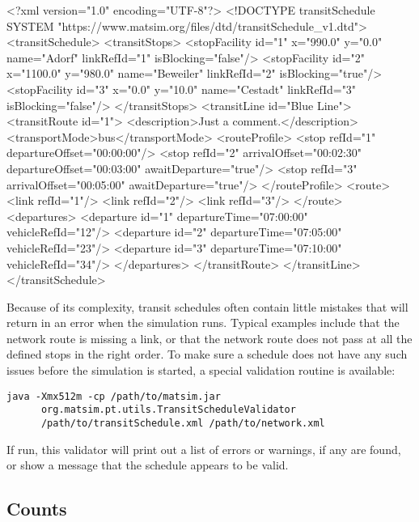 \begin{xml-file}[caption=An example of a schedule.xml,
label=lst:BuildingScenarios:schedule.xml]
<?xml version="1.0" encoding="UTF-8"?>
<!DOCTYPE transitSchedule SYSTEM "https://www.matsim.org/files/dtd/transitSchedule_v1.dtd">
<transitSchedule>
	<transitStops>
		<stopFacility id="1" x="990.0"  y="0.0"   name="Adorf"    
		                                          linkRefId="1" isBlocking="false"/>
		<stopFacility id="2" x="1100.0" y="980.0" name="Beweiler" 
		                                          linkRefId="2" isBlocking="true"/>
		<stopFacility id="3" x="0.0"    y="10.0"  name="Cestadt"  
		                                          linkRefId="3" isBlocking="false"/>
	</transitStops>
	<transitLine id="Blue Line">
		<transitRoute id="1">
			<description>Just a comment.</description>
			<transportMode>bus</transportMode>
			<routeProfile>
				<stop refId="1" departureOffset="00:00:00"/>
				<stop refId="2" arrivalOffset="00:02:30" departureOffset="00:03:00" 
				                                         awaitDeparture="true"/>
				<stop refId="3" arrivalOffset="00:05:00" awaitDeparture="true"/>
			</routeProfile>
			<route>
				<link refId="1"/>
				<link refId="2"/>
				<link refId="3"/>
			</route>
			<departures>
				<departure id="1" departureTime="07:00:00" vehicleRefId="12"/>
				<departure id="2" departureTime="07:05:00" vehicleRefId="23"/>
				<departure id="3" departureTime="07:10:00" vehicleRefId="34"/>
			</departures>
		</transitRoute>
	</transitLine>
</transitSchedule>
\end{xml-file}

Because of its complexity, transit schedules often contain little mistakes that
will return in an error when the simulation runs. Typical examples include that
the network route is missing a link, or that the network route does not pass at
all the defined stops in the right order. To make sure a schedule does not have
any such issues before the simulation is started, a special validation routine
is available:

\begin{verbatim}
java -Xmx512m -cp /path/to/matsim.jar 
      org.matsim.pt.utils.TransitScheduleValidator
      /path/to/transitSchedule.xml /path/to/network.xml
\end{verbatim}

If run, this validator will print out a list of errors or warnings, if any are
found, or show a message that the schedule appears to be valid.

\subsection{Counts}

